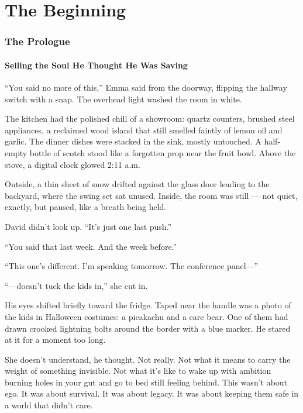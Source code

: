 \part{The Beginning}

\section{The Prologue}

\subsection{Selling the Soul He Thought He Was Saving}

“You said no more of this,” Emma said from the doorway, flipping the hallway switch with a snap. The overhead light 
washed the room in white.

The kitchen had the polished chill of a showroom: quartz counters, brushed steel appliances, a reclaimed wood island 
that still smelled faintly of lemon oil and garlic. The dinner dishes were stacked in the sink, mostly untouched. 
A half-empty bottle of scotch stood like a forgotten prop near the fruit bowl. Above the stove, a digital clock 
glowed 2:11 a.m.

Outside, a thin sheet of snow drifted against the glass door leading to the backyard, where the swing set sat unused. 
Inside, the room was still — not quiet, exactly, but paused, like a breath being held.

David didn’t look up. “It’s just one last push.”

“You said that last week. And the week before.”

“This one’s different. I’m speaking tomorrow. The conference panel—”

“—doesn’t tuck the kids in,” she cut in.

His eyes shifted briefly toward the fridge. Taped near the handle was a photo of the kids in Halloween costumes: a picakachu 
and a care bear. One of them had drawn crooked lightning bolts around the border with a blue marker. He stared at it for a 
moment too long.

She doesn’t understand, he thought. Not really. Not what it means to carry the weight of something invisible. Not what it’s 
like to wake up with ambition burning holes in your gut and go to bed still feeling behind. This wasn’t about ego. It was 
about survival. It was about legacy. It was about keeping them safe in a world that didn’t care.

